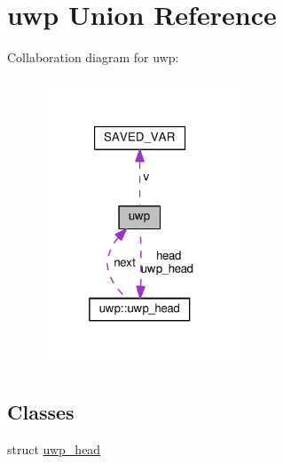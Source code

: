 \hypertarget{unionuwp}{}\section{uwp Union Reference}
\label{unionuwp}


Collaboration diagram for uwp\+:
\nopagebreak
\begin{figure}[H]
\begin{center}
\leavevmode
\includegraphics[width=169pt]{unionuwp__coll__graph}
\end{center}
\end{figure}
\subsection*{Classes}
\begin{DoxyCompactItemize}
\item 
struct \hyperlink{structuwp_1_1uwp__head}{uwp\+\_\+head}
\end{DoxyCompactItemize}
